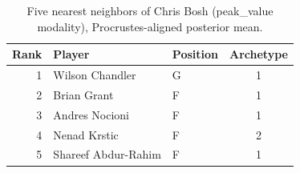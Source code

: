 \begin{table}[htbp]
  \centering\small
  \begin{tabular}{rllc}
    \toprule
    Rank & Player & Position & Archetype \\
    \midrule
    1 & Wilson Chandler & G & 1 \\
    2 & Brian Grant & F & 1 \\
    3 & Andres Nocioni & F & 1 \\
    4 & Nenad Krstic & F & 2 \\
    5 & Shareef Abdur-Rahim & F & 1 \\
    \bottomrule
  \end{tabular}
  \caption{Five nearest neighbors of Chris Bosh (peak_value modality), Procrustes-aligned posterior mean.}
  \label{tab:Chris_Bosh_neighbors_peak_value}
\end{table}

